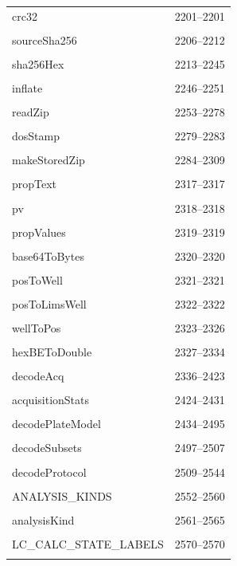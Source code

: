 {\begin{longtable}{@{}p{11cm}r@{}}
crc32 & 2201--2201 \\\\\hline
sourceSha256 & 2206--2212 \\\\\hline
sha256Hex & 2213--2245 \\\\\hline
inflate & 2246--2251 \\\\\hline
readZip & 2253--2278 \\\\\hline
dosStamp & 2279--2283 \\\\\hline
makeStoredZip & 2284--2309 \\\\\hline
propText & 2317--2317 \\\\\hline
pv & 2318--2318 \\\\\hline
propValues & 2319--2319 \\\\\hline
base64ToBytes & 2320--2320 \\\\\hline
posToWell & 2321--2321 \\\\\hline
posToLimsWell & 2322--2322 \\\\\hline
wellToPos & 2323--2326 \\\\\hline
hexBEToDouble & 2327--2334 \\\\\hline
decodeAcq & 2336--2423 \\\\\hline
acquisitionStats & 2424--2431 \\\\\hline
decodePlateModel & 2434--2495 \\\\\hline
decodeSubsets & 2497--2507 \\\\\hline
decodeProtocol & 2509--2544 \\\\\hline
ANALYSIS\_KINDS & 2552--2560 \\\\\hline
analysisKind & 2561--2565 \\\\\hline
LC\_CALC\_STATE\_LABELS & 2570--2570 \\\\\hline

\end{longtable}}
